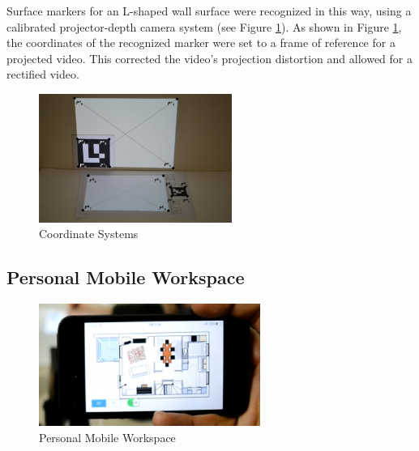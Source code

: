 

Surface markers for an L-shaped wall surface were recognized in this way, using a calibrated projector-depth camera system (see Figure \ref{fig:coordinate}). As shown in Figure \ref{fig:coordinate}, the coordinates of the recognized marker were set to a frame of reference for a projected video. This corrected the video's projection distortion and allowed for a rectified video.

\begin{figure}[t!]
\centering
\includegraphics[width=0.8\columnwidth, height=4.2cm]{3-System/coordinates}
\caption{Coordinate Systems}
\label{fig:coordinate}
\end{figure}


\subsection{Personal Mobile Workspace}

\begin{figure}[!b]
\centering
\includegraphics[width=1.0\columnwidth, height=4cm]{3-System/2d}
\caption{Personal Mobile Workspace}
\label{fig:pmw}
\end{figure}

